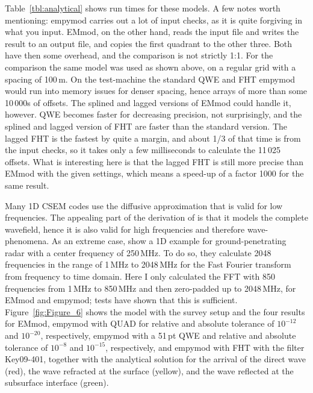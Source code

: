 \documentclass[manuscript,revised]{geophysics}
\begin{document}
Table~\ref{tbl:analytical} shows run times for these models. A few notes worth
mentioning: empymod carries out a lot of input checks, as it is quite forgiving
in what you input. EMmod, on the other hand, reads the input file and writes
the result to an output file, and copies the first quadrant to the other three.
Both have then some overhead, and the comparison is not strictly 1:1. For the
comparison the same model was used as shown above, on a regular grid with a
spacing of 100\,m. On the test-machine the standard QWE and FHT empymod would
run into memory issues for denser spacing, hence arrays of more than some
10\,000s of offsets. The splined and lagged versions of EMmod could handle it,
however.
%
%
QWE becomes faster for decreasing precision, not surprisingly, and the splined
and lagged version of FHT are faster than the standard version. The lagged FHT
is the fastest by quite a margin, and about 1/3 of that time is from the input
checks, so it takes only a few milliseconds to calculate the 11\,025 offsets.
What is interesting here is that the lagged FHT is still more precise than
EMmod with the given settings, which means a speed-up of a factor 1000 for the
same result.

Many 1D CSEM codes use the diffusive approximation that is valid for low
frequencies. The appealing part of the derivation of \cite{GEO.15.Hunziker} is
that it models the complete wavefield, hence it is also valid for high
frequencies and therefore wave-phenomena. As an extreme case,
\cite{GEO.15.Hunziker} show a 1D example for ground-penetrating radar with a
center frequency of 250\,MHz. To do so, they calculate 2048 frequencies in the
range of 1\,MHz to 2048\,MHz for the Fast Fourier transform from frequency to
time domain. Here I only calculated the FFT with 850 frequencies from 1\,MHz to
850\,MHz and then zero-padded up to 2048\,MHz, for EMmod and empymod; tests
have shown that this is sufficient. Figure~\ref{fig:Figure_6} shows the model
with the survey setup and the four results for EMmod, empymod with QUAD for
relative and absolute tolerance of $10^{-12}$ and $10^{-20}$, respectively,
empymod with a 51\,pt QWE and relative and absolute tolerance of $10^{-8}$ and
$10^{-15}$, respectively, and empymod with FHT with the filter Key09-401,
together with the analytical solution for the arrival of the direct wave (red),
the wave refracted at the surface (yellow), and the wave reflected at the
subsurface interface (green).
\end{document}

